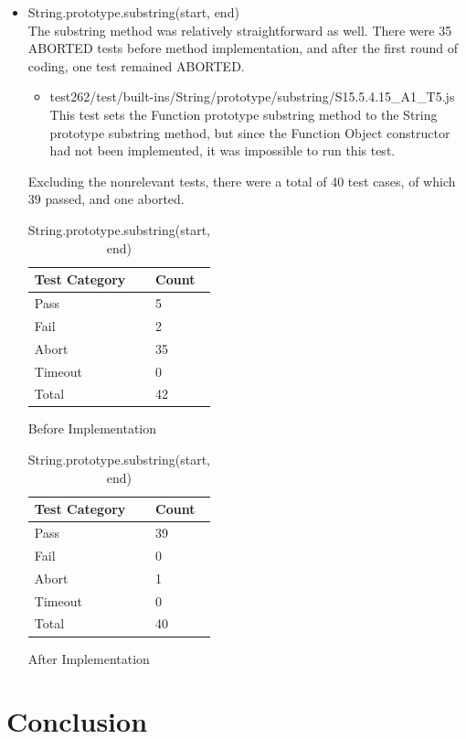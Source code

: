 \documentclass[a4paper,11pt,twoside]{report}
\begin{document}
\begin{itemize}
\item String.prototype.substring(start, end) \\
The substring method was relatively straightforward as well. There were 35 ABORTED tests before method implementation, and after the first round of coding, one test remained ABORTED. 
\begin{itemize}
\item test262/test/built-ins/String/prototype/substring/S15.5.4.15\_A1\_T5.js \\
This test sets the Function prototype substring method to the String prototype substring method, but since the Function Object constructor had not been implemented, it was impossible to run this test.
\end{itemize}
Excluding the nonrelevant tests, there were a total of 40 test cases, of which 39 passed, and one aborted.
\begin{table}[ht!]
\centering
\begin{subtable}{0.5\textwidth}
\centering
\begin{tabular}{|p{3cm}|p{2cm}|} \hline
\textbf{Test Category} & \textbf{Count} \\ \hline
Pass & 5 \\
Fail & 2 \\
Abort & 35 \\
Timeout & 0 \\
Total & 42 \\ \hline
\end{tabular}
\caption{Before Implementation}
\end{subtable}%
\begin{subtable}{0.5\textwidth}
\centering
\begin{tabular}{|p{3cm}|p{2cm}|} \hline
\textbf{Test Category} & \textbf{Count} \\ \hline
Pass & 39 \\
Fail & 0 \\
Abort & 1 \\
Timeout & 0 \\
Total & 40 \\ \hline
\end{tabular}
\caption{After Implementation}
\end{subtable}
\caption{String.prototype.substring(start, end)}
\end{table}

\end{itemize}






\chapter{Conclusion}




\end{document}
